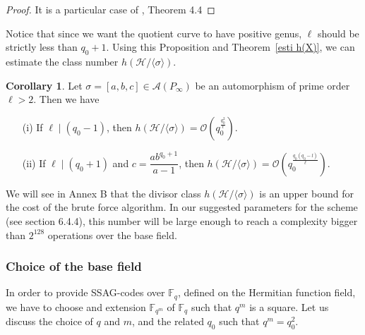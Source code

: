 \documentclass[10pt]{article}
\theoremstyle{definition}
\newtheorem{coro1}[thm]{Corollary}
\theoremstyle{definition}
\theoremstyle{definition}
\newcommand{\s}{\vspace{0.3cm}}
\newcommand{\calA}{\mathcal{A}}
\newcommand{\calH}{\mathcal{H}}
\newcommand{\calO}{\mathcal{O}}
\newcommand{\fqm}{\mathbb{F}_{q^m}}
\newcommand{\fq}{\mathbb{F}_q}
\begin{document}
\s

\begin{proof}
It is a particular case of \cite{Gar}, Theorem 4.4
\end{proof}

Notice that since we want the quotient curve to have positive genus, $\ell$ should be strictly less than $q_0+1$. Using this Proposition and Theorem~\ref{esti h(X)}, we can estimate the class number $h(\calH/\langle \sigma \rangle)$.

\s

\begin{coro1} \label{lastcorollary}
Let $\sigma = [a,b,c] \in \calA(P_{\infty})$ be an automorphism of prime order $\ell > 2$. Then we have 
\begin{itemize}
\item[(i)] If $\ell \mid (q_0-1)$, then $h(\calH/\langle \sigma \rangle) = \calO \left(q_0^{\frac{q_0^2}{\ell}}\right)$.
\item[(ii)] If $\ell \mid (q_0+1)$ and $c=\dfrac{ab^{q_0+1}}{a-1}$, then $h(\calH/\langle \sigma \rangle) = \calO \left(q_0^{\frac{q_0(q_0-l)}{\ell}}\right)$.
\end{itemize}
\end{coro1}

\s 

We will see in Annex B that the divisor class $h(\calH/\langle \sigma \rangle)$
is an upper bound for the cost of the brute force algorithm. In our suggested parameters for the scheme (see section 6.4.4), this number will be large enough to reach a complexity bigger than $2^{128}$ operations over the base field.

\s

\subsubsection{Choice of the base field}

\s

In order to provide SSAG-codes over $\fq$, defined on the Hermitian function field, we have to choose and extension $\fqm$ of $\fq$ such that $q^m$ is a square. Let us discuss the choice of $q$ and $m$, and the related $q_0$ such that $q^m=q_0^2$.
\end{document}
